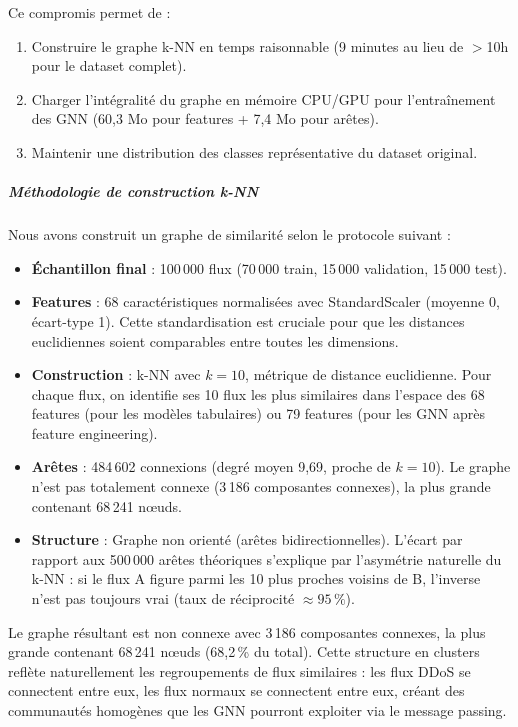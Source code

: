 ﻿\documentclass[11pt,a4paper]{article}
\begin{document}
Ce compromis permet de :
\begin{enumerate}
    \item Construire le graphe k-NN en temps raisonnable (9 minutes au lieu de $>$10h pour le dataset complet).
    \item Charger l'intégralité du graphe en mémoire CPU/GPU pour l'entraînement des GNN (60,3 Mo pour features + 7,4 Mo pour arêtes).
    \item Maintenir une distribution des classes représentative du dataset original.
\end{enumerate}

\subparagraph{Méthodologie de construction k-NN}

Nous avons construit un graphe de similarité selon le protocole suivant :
\begin{itemize}
    \item \textbf{Échantillon final} : 100\,000 flux (70\,000 train, 15\,000 validation, 15\,000 test).
    \item \textbf{Features} : 68 caractéristiques normalisées avec StandardScaler (moyenne 0, écart-type 1). Cette standardisation est cruciale pour que les distances euclidiennes soient comparables entre toutes les dimensions.
    \item \textbf{Construction} : k-NN avec $k = 10$, métrique de distance euclidienne. Pour chaque flux, on identifie ses 10 flux les plus similaires dans l'espace des 68 features (pour les modèles tabulaires) ou 79 features (pour les GNN après feature engineering).
    \item \textbf{Arêtes} : 484\,602 connexions (degré moyen 9{,}69, proche de $k = 10$). Le graphe n'est pas totalement connexe (3\,186 composantes connexes), la plus grande contenant 68\,241 nœuds.
    \item \textbf{Structure} : Graphe non orienté (arêtes bidirectionnelles). L'écart par rapport aux 500\,000 arêtes théoriques s'explique par l'asymétrie naturelle du k-NN : si le flux A figure parmi les 10 plus proches voisins de B, l'inverse n'est pas toujours vrai (taux de réciprocité $\approx 95\,\%$).
\end{itemize}

Le graphe résultant est non connexe avec 3\,186 composantes connexes, la plus grande contenant 68\,241 nœuds (68,2\,\% du total). Cette structure en clusters reflète naturellement les regroupements de flux similaires : les flux DDoS se connectent entre eux, les flux normaux se connectent entre eux, créant des communautés homogènes que les GNN pourront exploiter via le message passing.
\end{document}
